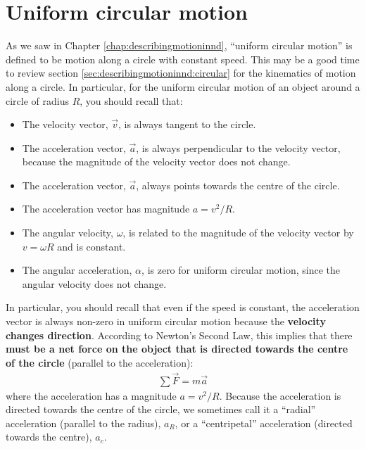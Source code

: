 \section{Uniform circular motion}
As we saw in Chapter \ref{chap:describingmotioninnd}, ``uniform circular motion'' is defined to be motion along a circle with constant speed. This may be a good time to review section \ref{sec:describingmotioninnd:circular} for the kinematics of motion along a circle. In particular, for the uniform circular motion of an object around a circle of radius $R$, you should recall that:
\begin{itemize}
\item The velocity vector, $\vec v$, is always tangent to the circle.
\item The acceleration vector, $\vec a$, is always perpendicular to the velocity vector, because the magnitude of the velocity vector does not change.
\item The acceleration vector, $\vec a$, always points towards the centre of the circle.
\item The acceleration vector has magnitude $a=v^2/R$.
\item The angular velocity, $\omega$, is related to the magnitude of the velocity vector by $v=\omega R$ and is constant.
\item The angular acceleration, $\alpha$, is zero for uniform circular motion, since the angular velocity does not change.
\end{itemize}
In particular, you should recall that even if the speed is constant, the acceleration vector is always non-zero in uniform circular motion because the \textbf{velocity changes direction}. According to Newton's Second Law, this implies that there \textbf{must be a net force on the object that is directed towards the centre of the circle} (parallel to the acceleration):
\begin{align*}
\sum \vec F = m\vec a
\end{align*} 
where the acceleration has a magnitude $a=v^2/R$. Because the acceleration is directed towards the centre of the circle, we sometimes call it a ``radial'' acceleration (parallel to the radius), $a_R$, or a ``centripetal'' acceleration (directed towards the centre), $a_c$.

